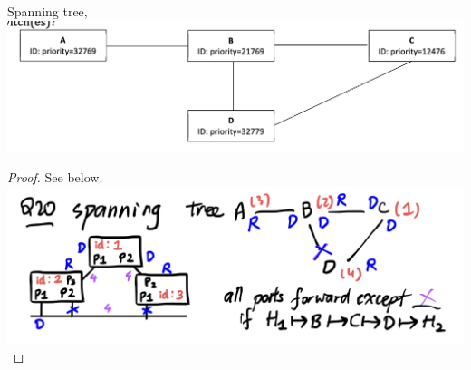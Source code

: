 \documentclass[./answersheet.tex]{subfiles}
\begin{document}
\begin{wts}
    Spanning tree, \\
    \includegraphics[width=\columnwidth]{./q20.png}
\end{wts}
\begin{proof}
    See below.\\
    \includegraphics[width=\columnwidth]{./spanning_tree_1.jpeg}
\end{proof}
\end{document}
